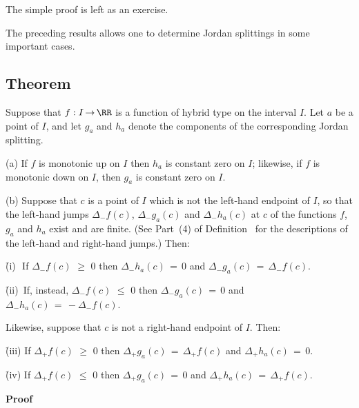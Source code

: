 \V

        The simple proof is left as an exercise.


        The preceding results allows one to determine Jordan splittings in some important cases.

\V

             \subsection{\small{\bf Theorem}}
            \label{ThmF40.150}

\V

        Suppose that $f:I \,{\rightarrow}\, {\RR}$ is a function of hybrid type on the interval $I$.
    Let $a$ be a point of $I$, and let $g_{a}$ and $h_{a}$ denote the components of the corresponding Jordan splitting.

\V

        (a) If $f$ is monotonic up on $I$ then $h_{a}$ is constant zero on $I$;
    likewise, if $f$ is monotonic down on $I$, then $g_{a}$ is constant zero on $I$.

\V

        (b) Suppose that $c$ is a point of $I$ which is not the left-hand endpoint of $I$,
    so that the left-hand jumps ${\Delta}_{-} f(c)$, ${\Delta}_{-} g_{a}(c)$ and ${\Delta}_{-} h_{a}(c)$ at $c$ of the functions $f$, $g_{a}$ and $h_{a}$ exist and are finite.
    (See Part~(4) of Definition~ for the descriptions of the left-hand and right-hand jumps.) Then:

       \h (i)\,\, If ${\Delta}_{-}f(c)\,\,{\geq}\,\,0$ then ${\Delta}_{-} h_{a}(c) \,=\, 0$ and ${\Delta}_{-}g_{a}(c) \,=\, {\Delta}_{-} f(c)$.


       \h (ii)\, If, instead, ${\Delta}_{-} f(c)\,\,{\leq}\,\,0$ then ${\Delta}_{-} g_{a}(c) \,=\, 0$ and ${\Delta}_{-} h_{a}(c) \,=\, -{\Delta}_{-} f(c)$.

\noindent Likewise, suppose that $c$ is not a right-hand endpoint of $I$.
    Then:

        \h (iii) If ${\Delta}_{+}f(c)\,\,{\geq}\,\,0$ then ${\Delta}_{+}g_{a}(c) \,=\, {\Delta}_{+} f(c)$ and ${\Delta}_{+} h_{a}(c) \,=\, 0$.

        \h (iv) If ${\Delta}_{+}f(c)\,\,{\leq}\,\,0$ then ${\Delta}_{+}g_{a}(c) \,=\, 0$ and ${\Delta}_{+} h_{a}(c) \,=\, {\Delta}_{+} f(c)$.

\V

        {\bf Proof}

\V

